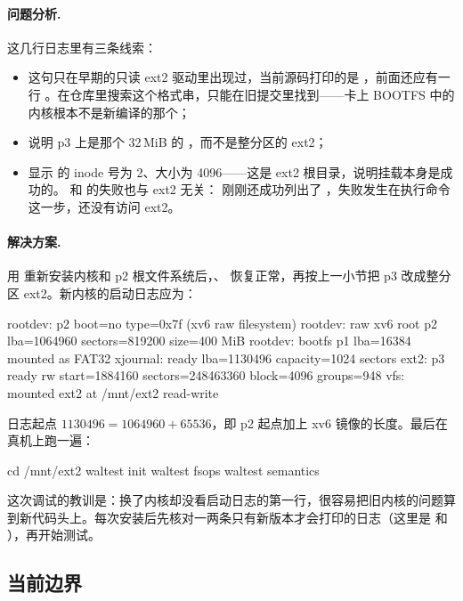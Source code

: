 \paragraph{问题分析.} 这几行日志里有三条线索：

\begin{itemize}
  \item {} 这句只在早期的只读 ext2 驱动里出现过，当前源码打印的是 ，前面还应有一行 。在仓库里搜索这个格式串，只能在旧提交里找到——卡上 BOOTFS 中的内核根本不是新编译的那个；
  \item {} 说明 p3 上是那个 32\,MiB 的 ，而不是整分区的 ext2；
  \item {} 显示  的 inode 号为 2、大小为 4096——这是 ext2 根目录，说明挂载本身是成功的。 和  的失败也与 ext2 无关： 刚刚还成功列出了 ，失败发生在执行命令这一步，还没有访问 ext2。
\end{itemize}

\paragraph{解决方案.} 用  重新安装内核和 p2 根文件系统后，、 恢复正常，再按上一小节把 p3 改成整分区 ext2。新内核的启动日志应为：

\begin{txtcode}
rootdev: p2 boot=no type=0x7f (xv6 raw filesystem)
rootdev: raw xv6 root p2 lba=1064960 sectors=819200 size=400 MiB
rootdev: bootfs p1 lba=16384 mounted as FAT32
xjournal: ready lba=1130496 capacity=1024 sectors
ext2: p3 ready rw start=1884160 sectors=248463360 block=4096 groups=948
vfs: mounted ext2 at /mnt/ext2 read-write
\end{txtcode}

日志起点 $1130496 = 1064960 + 65536$，即 p2 起点加上 xv6 镜像的长度。最后在真机上跑一遍：

\begin{shcode}
cd /mnt/ext2
waltest init
waltest fsops
waltest semantics
\end{shcode}

这次调试的教训是：换了内核却没看启动日志的第一行，很容易把旧内核的问题算到新代码头上。每次安装后先核对一两条只有新版本才会打印的日志（这里是  和 ），再开始测试。

\subsection{当前边界}

